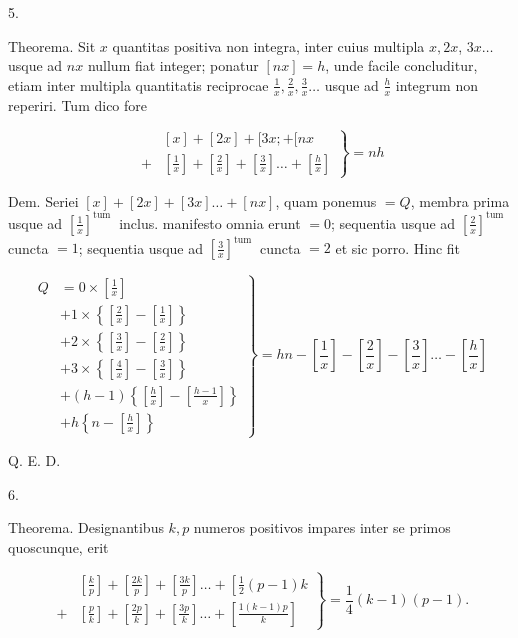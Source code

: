 \documentclass[10pt]{article}
\begin{document}
5.

Theorema. Sit \(x\) quantitas positiva non integra, inter cuius multipla \(x, 2 x\), \(3 x \ldots\) usque ad \(n x\) nullum fiat integer; ponatur \([n x]=h\), unde facile concluditur, etiam inter multipla quantitatis reciprocae \(\frac{1}{x}, \frac{2}{x}, \frac{3}{x} \ldots\) usque ad \(\frac{h}{x}\) integrum non reperiri. Tum dico fore

\[
\left.\begin{array}{rl} 
& {[x]+[2 x]+[3 x ;+[n x} \\
+ & {\left[\frac{1}{x}\right]+\left[\frac{2}{x}\right]+\left[\frac{3}{x}\right] \ldots+\left[\frac{h}{x}\right]}
\end{array}\right\}=n h
\]

Dem. Seriei \([x]+[2 x]+[3 x] \ldots+[n x]\), quam ponemus \(=Q\), membra prima usque ad \(\left[\frac{1}{x}\right]^{\text {tum }}\) inclus. manifesto omnia erunt \(=0\); sequentia usque ad \(\left[\frac{2}{x}\right]^{\text {tum }}\) cuncta \(=1\); sequentia usque ad \(\left[\frac{3}{x}\right]^{\text {tum }}\) cuncta \(=2\) et sic porro. Hinc fit

\[
\left.\begin{array}{rl}
Q & =0 \times\left[\frac{1}{x}\right] \\
& +1 \times\left\{\left[\frac{2}{x}\right]-\left[\frac{1}{x}\right]\right\} \\
& +2 \times\left\{\left[\frac{3}{x}\right]-\left[\frac{2}{x}\right]\right\} \\
& +3 \times\left\{\left[\frac{4}{x}\right]-\left[\frac{3}{x}\right]\right\} \\
& +(h-1)\left\{\left[\frac{h}{x}\right]-\left[\frac{h-1}{x}\right]\right\} \\
& +h\left\{n-\left[\frac{h}{x}\right]\right\}
\end{array}\right\}=h n-\left[\frac{1}{x}\right]-\left[\frac{2}{x}\right]-\left[\frac{3}{x}\right] \ldots-\left[\frac{h}{x}\right]
\]

Q. E. D.

6.

Theorema. Designantibus \(k, p\) numeros positivos impares inter se primos quoscunque, erit

\[
\left.\begin{array}{rl} 
& {\left[\frac{k}{p}\right]+\left[\frac{2 k}{p}\right]+\left[\frac{3 k}{p}\right] \ldots+\left[\frac{1}{2}(p-1) k\right.} \\
+ & {\left[\frac{p}{k}\right]+\left[\frac{2 p}{k}\right]+\left[\frac{3 p}{k}\right] \ldots+\left[\frac{1(k-1) p}{k}\right]}
\end{array}\right\}=\frac{1}{4}(k-1)(p-1) .
\]
\end{document}
